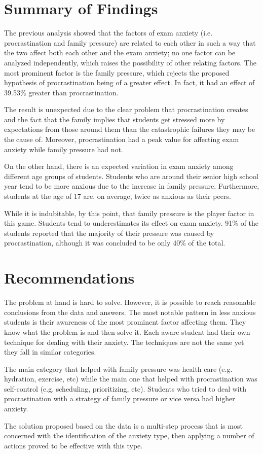 \documentclass[12pt]{report}
\begin{document}
\begin{multicols}{2}

\section{Summary of Findings}

The previous analysis showed that the factors of exam anxiety (i.e.
procrastination and family pressure) are related to each other in such a way
that the two affect both each other and the exam anxiety; no one factor can be
analyzed independently, which raises the possibility of other relating factors.
The most prominent factor is the family pressure, which rejects the proposed
hypothesis of procrastination being of a greater effect. In fact, it had an
effect of 39.53\% greater than procrastination.

The result is unexpected due to the clear problem that procrastination creates
and the fact that the family implies that students get stressed more by
expectations from those around them than the catastrophic failures they may be
the cause of. Moreover, procrastination had a peak value for affecting exam
anxiety while family pressure had not.

On the other hand, there is an expected variation in exam anxiety among
different age groups of students. Students who are around their senior high
school year tend to be more anxious due to the increase in family pressure.
Furthermore, students at the age of 17 are, on average, twice as anxious as
their peers. 

While it is indubitable, by this point, that family pressure is the player
factor in this game. Students tend to underestimates its effect on exam anxiety.
91\% of the students reported that the majority of their pressure was caused by
procrastination, although it was concluded to be only 40\% of the total.

\section{Recommendations}

The problem at hand is hard to solve. However, it is possible to reach
reasonable conclusions from the data and answers. The most notable pattern in
less anxious students is their awareness of the most prominent factor affecting
them. They know what the problem is and then solve it. Each aware student had
their own technique for dealing with their anxiety. The techniques are not the
same yet they fall in similar categories.

The main category that helped with family pressure was health care (e.g.
hydration, exercise, etc) while the main one that helped with procrastination
was self-control (e.g. scheduling, prioritizing, etc). Students who tried to
deal with procrastination with a strategy of family pressure or vice versa had
higher anxiety.

The solution proposed based on the data is a multi-step process that is most
concerned with the identification of the anxiety type, then applying a number
of actions proved to be effective with this type.

\end{multicols}
\end{document}
